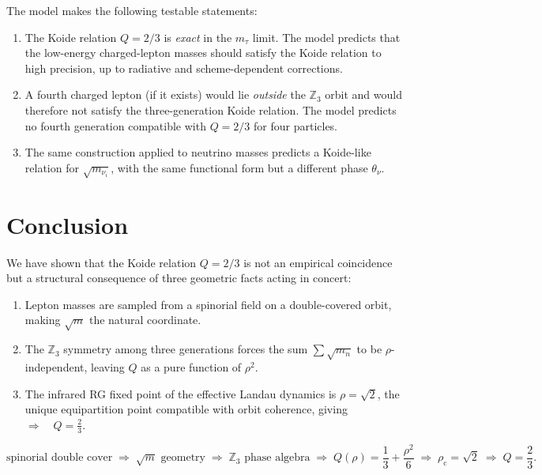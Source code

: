 \documentclass[12pt,a4paper]{article}
\theoremstyle{definition}
\begin{document}
The model makes the following testable statements:
\begin{enumerate}[label=(\roman*)]
  \item The Koide relation $Q = 2/3$ is \emph{exact} in the $m_\tau$ limit.
        The model predicts that the low-energy charged-lepton masses should satisfy the Koide relation to high precision, up to radiative and scheme-dependent corrections.
  \item A fourth charged lepton (if it exists) would lie \emph{outside} the
        $\mathbb{Z}_3$ orbit and would therefore not satisfy the three-generation
        Koide relation. The model predicts no fourth generation compatible with
        $Q = 2/3$ for four particles.
  \item The same construction applied to neutrino masses predicts a Koide-like
        relation for $\sqrt{m_{\nu_i}}$, with the same functional form but a
        different phase $\theta_\nu$.
\end{enumerate}

\section{Conclusion}
\label{sec:conclusion}

We have shown that the Koide relation $Q = 2/3$ is not an empirical coincidence but
a structural consequence of three geometric facts acting in concert:
\begin{enumerate}[label=(\roman*)]
  \item Lepton masses are sampled from a spinorial field on a double-covered orbit,
        making $\sqrt{m}$ the natural coordinate.
  \item The $\mathbb{Z}_3$ symmetry among three generations forces the sum
        $\sum\sqrt{m_n}$ to be $\rho$-independent, leaving $Q$ as a pure function
        of $\rho^2$.
  \item The infrared RG fixed point of the effective Landau dynamics is $\rho = \sqrt{2}$,
        the unique equipartition point compatible with orbit coherence, giving $\Rightarrow \quad Q = \frac{2}{3}$.
\end{enumerate}

\[
\text{spinorial double cover}
\;\Rightarrow\;
\sqrt{m}\text{ geometry}
\;\Rightarrow\;
\mathbb{Z}_3\text{ phase algebra}
\;\Rightarrow\;
Q(\rho)=\frac13+\frac{\rho^2}{6}
\;\Rightarrow\;
\rho_{\mathrm c}=\sqrt2
\;\Rightarrow\;
Q=\frac23.
\]
\end{document}

